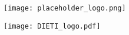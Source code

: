 \pagecolor{TERTIARY}\afterpage{\nopagecolor}
\begin{titlepage}
  \begin{center}
    \vspace*{0.8cm}
    \Huge
    \textbf{\maintitle{}}

    \vspace*{0.5cm}

    \color{SECONDARY}
    \large
    \textbf{\authors{}}
    
    \vfill

    \texttt{[image: placeholder\_logo.png]}
    
    \vfill

    \vspace*{0.5cm}
    \texttt{[image: DIETI\_logo.pdf]}
    \vspace*{-0.5cm}
  \end{center}
\end{titlepage}